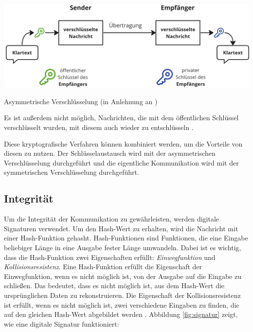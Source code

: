 \begin{center}
    \captionsetup{type=figure}
    \includegraphics[width=1\linewidth]{images/asymmetric_encryption.png}
    \caption{Asymmetrische Verschlüsselung (in Anlehnung an \cite{ElektronikKompendium_asymmetrischeVerschluesselung})}
    \label{fig:asymmetrische_verschluesselung}
\end{center}

\noindent Es ist außerdem nicht möglich, Nachrichten, die mit dem öffentlichen Schlüssel verschlüsselt wurden, mit diesem auch wieder zu entschlüsseln \parencite{ElektronikKompendium_asymmetrischeVerschluesselung}. 

Diese kryptografische Verfahren können kombiniert werden, um die Vorteile von diesen zu nutzen. Der Schlüsselaustausch wird mit der asymmetrischen Verschlüsselung durchgeführt und die eigentliche Kommunikation wird mit der symmetrischen Verschlüsselung durchgeführt.


\subsection{Integrität}
\label{subsec:integritaet_signatur}

Um die Integrität der Kommunikation zu gewährleisten, werden digitale Signaturen verwendet. Um den Hash-Wert zu erhalten, wird die Nachricht mit einer Hash-Funktion gehasht. Hash-Funktionen sind Funktionen, die eine Eingabe beliebiger Länge in eine Ausgabe fester Länge umwandeln. Dabei ist es wichtig, dass die Hash-Funktion zwei Eigenschaften erfüllt: \textit{Einwegfunktion} und \textit{Kollisionsresistenz}. Eine Hash-Funktion erfüllt die Eigenschaft der Einwegfunktion, wenn es nicht möglich ist, von der Ausgabe auf die Eingabe zu schließen. Das bedeutet, dass es nicht möglich ist, aus dem Hash-Wert die ursprünglichen Daten zu rekonstruieren. Die Eigenschaft der Kollisionsresistenz ist erfüllt, wenn es nicht möglich ist, zwei verschiedene Eingaben zu finden, die auf den gleichen Hash-Wert abgebildet werden \parencites[S. 12-13]{Brünnler_BlockchainKurzGut}[S. 6]{Fill_BlockchainGrundlagen}. Abbildung \ref{fig:signatur} zeigt, wie eine digitale Signatur funktioniert:

